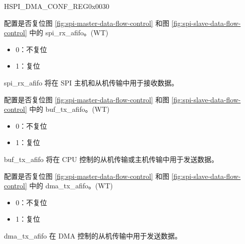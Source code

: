 \begin{register}{H}{SPI\_DMA\_CONF\_REG}{0x0030}
\begin{regdesc}
\begin{reglist}
\label{fielddesc:SPIRXAFIFORST}\item [SPI\_RX\_AFIFO\_RST] 配置是否复位图 \ref{fig:spi-master-data-flow-control} 和图 \ref{fig:spi-slave-data-flow-control} 中的 spi\_rx\_afifo。(WT)\\
\begin{itemize}
    \item 0：不复位
    \item 1：复位
\end{itemize}
spi\_rx\_afifo 将在 SPI 主机和从机传输中用于接收数据。 
\label{fielddesc:SPIBUFAFIFORST}\item [SPI\_BUF\_AFIFO\_RST] 配置是否复位图 \ref{fig:spi-master-data-flow-control} 和图 \ref{fig:spi-slave-data-flow-control} 中的 buf\_tx\_afifo。(WT)\\
\begin{itemize}
    \item 0：不复位
    \item 1：复位
\end{itemize}
buf\_tx\_afifo 将在 CPU 控制的从机传输或主机传输中用于发送数据。
\label{fielddesc:SPIDMAAFIFORST}\item [SPI\_DMA\_AFIFO\_RST] 配置是否复位图 \ref{fig:spi-master-data-flow-control} 和图 \ref{fig:spi-slave-data-flow-control} 中的 dma\_tx\_afifo。(WT)\\
\begin{itemize}
    \item 0：不复位
    \item 1：复位
\end{itemize}
dma\_tx\_afifo 在 DMA 控制的从机传输中用于发送数据。 
\end{reglist}\end{regdesc}
\end{register}


